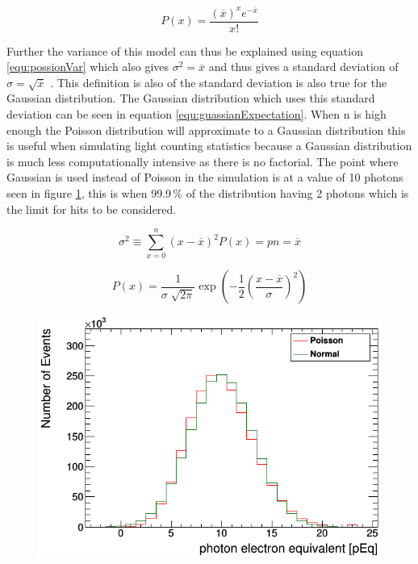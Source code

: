 \begin{equation}
P(x) = \frac{(\overline{x})^x e^{-\overline{x}}}{x!}  
\label{equ:possionExpectation}
\end{equation}

Further the variance of this model can thus be explained using equation  \ref{equ:possionVar} which also gives $\sigma^2 = \overline{x}$ and thus gives a standard deviation of $\sigma = \sqrt{\overline{x}}$ \cite{knoll_2010}. This definition is also of the standard deviation is also true for the Gaussian distribution. The Gaussian distribution which uses this standard deviation can be seen in equation \ref{equ:guassianExpectation}. When n is high enough the Poisson distribution will approximate to a Gaussian distribution this is useful when simulating light counting statistics because a Gaussian distribution is much less computationally intensive as there is no factorial. The point where Gaussian is used instead of Poisson in the simulation is at a value of 10 photons seen in figure \ref{fig:CoutingStats10}, this is when 99.9\,\% of the distribution having 2 photons which is the limit for hits to be considered. 

\begin{equation}
\sigma ^2 \equiv \sum_{x=0}^{n} (x-\overline{x})^2 P(x) = pn = \overline{x} 
\label{equ:possionVar}
\end{equation}

\begin{equation}
P(x) = \frac{1}{\sigma \sqrt[]{2 \pi}} \exp \left(-\frac{1}{2}\left(\frac{x-\overline{x}}{\sigma}\right)^{2}\right)
\label{equ:guassianExpectation}
\end{equation}

\begin{figure}[htbp]
 \centering
 \includegraphics[width=0.8\linewidth]{countingStats10.png}
 \label{fig:CoutingStats10}
\end{figure}

